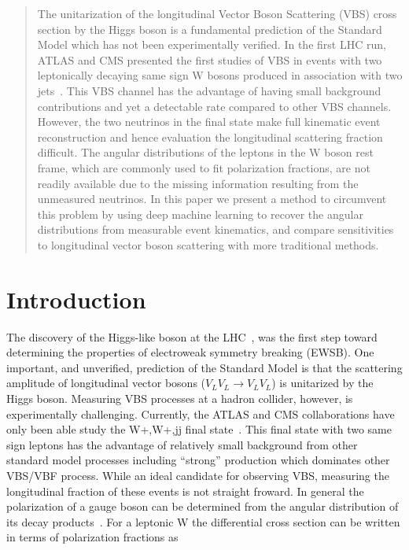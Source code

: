 \documentclass[10pt,twocolumn]{article}
\begin{document}
\begin{abstract}The unitarization of the longitudinal Vector Boson Scattering (VBS) cross section by the Higgs boson is a fundamental prediction of the Standard Model which has not been experimentally verified. In the first LHC run, ATLAS and CMS presented the first studies of VBS in events with two leptonically decaying same sign W bosons produced in association with two jets~\cite{a,b}. This VBS channel has the advantage of having small background contributions and yet a detectable rate compared to other VBS channels. However, the two neutrinos in the final state make full kinematic event reconstruction and hence evaluation the longitudinal scattering fraction difficult. The angular distributions of the leptons in the W boson rest frame, which are commonly used to fit polarization fractions, are not readily available due to the missing information resulting from the unmeasured neutrinos. In this paper we present a method to circumvent this problem by using deep machine learning to recover the angular distributions from measurable event kinematics, and compare sensitivities to longitudinal vector boson scattering with more traditional methods.
\end{abstract}

\section{Introduction}


The discovery of the Higgs-like boson at the
LHC~\cite{ATLAS_higgs,CMS_higgs}, was the first step toward
determining the properties of electroweak symmetry breaking
(EWSB). One important, and unverified, prediction of the Standard
Model is that the scattering amplitude of longitudinal vector bosons
($V_{L}V_{L} \rightarrow V_{L}V_{L}$) is unitarized by the Higgs
boson. Measuring VBS processes at a hadron collider, however, is
experimentally challenging. Currently, the ATLAS and CMS
collaborations have only been able study the W+,W+,jj final
state~\cite{ATLAS_ssWW,CMS_ssWW}. This final state with two same sign
leptons has the advantage of relatively small background from other
standard model processes including ``strong'' production which
dominates other VBS/VBF process. While an ideal candidate for
observing VBS, measuring the longitudinal fraction of these events is
not straight froward. In general the polarization of a gauge boson can
be determined from the angular distribution of its decay
products~\cite{?}. For a leptonic W the differential cross section can
be written in terms of polarization fractions as
\end{document}
